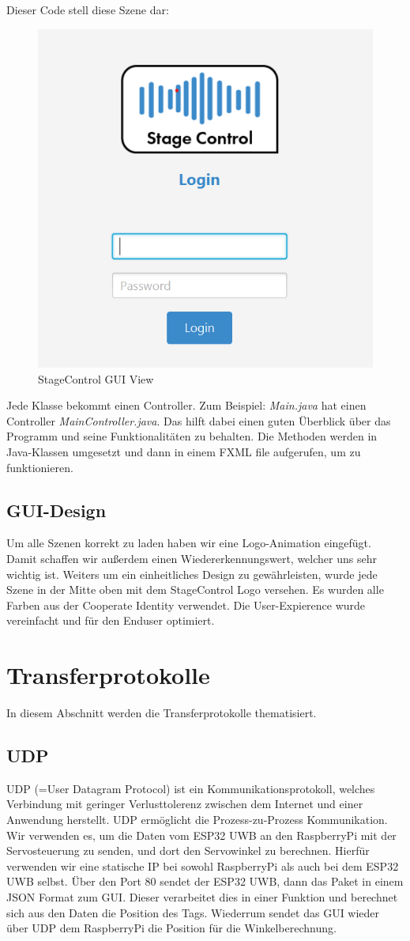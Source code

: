 Dieser Code stell diese Szene dar:
\begin{figure}[H]
	\centering
	\includegraphics[width=0.5\linewidth]{images/StagecontrolViewGUI.png}
	\caption[StageControl GUI View]{StageControl GUI View}
	\label{fig:StageControlViewGUI}
\end{figure}


Jede Klasse bekommt einen Controller. Zum Beispiel: \textit{Main.java} hat einen Controller \textit{MainController.java}. Das hilft dabei einen guten Überblick über das Programm und seine Funktionalitäten zu behalten. Die Methoden werden in Java-Klassen umgesetzt und dann in einem FXML file aufgerufen, um zu funktionieren.

\subsection{GUI-Design}
Um alle Szenen korrekt zu laden haben wir eine Logo-Animation eingefügt. Damit schaffen wir außerdem einen Wiedererkennungswert, welcher uns sehr wichtig ist. Weiters um ein einheitliches Design zu gewährleisten, wurde jede Szene in der Mitte oben mit dem StageControl Logo versehen. Es wurden alle Farben aus der Cooperate Identity verwendet. Die User-Expierence wurde vereinfacht und für den Enduser optimiert.   


\section{Transferprotokolle}
In diesem Abschnitt werden die Transferprotokolle thematisiert.

\subsection{UDP}
UDP (=User Datagram Protocol) ist ein Kommunikationsprotokoll, welches Verbindung mit geringer Verlusttolerenz zwischen dem Internet und einer Anwendung herstellt. UDP ermöglicht die Prozess-zu-Prozess Kommunikation. Wir verwenden es, um die Daten vom ESP32 UWB an den RaspberryPi mit der Servosteuerung zu senden, und dort den Servowinkel zu berechnen. Hierfür verwenden wir eine statische IP bei sowohl RaspberryPi als auch bei dem ESP32 UWB selbst. Über den Port 80 sendet der ESP32 UWB, dann das Paket in einem JSON Format zum GUI. Dieser verarbeitet dies in einer Funktion und berechnet sich aus den Daten die Position des Tags. Wiederrum sendet das GUI wieder über UDP dem RaspberryPi die Position für die Winkelberechnung. \parencite{UDP}

